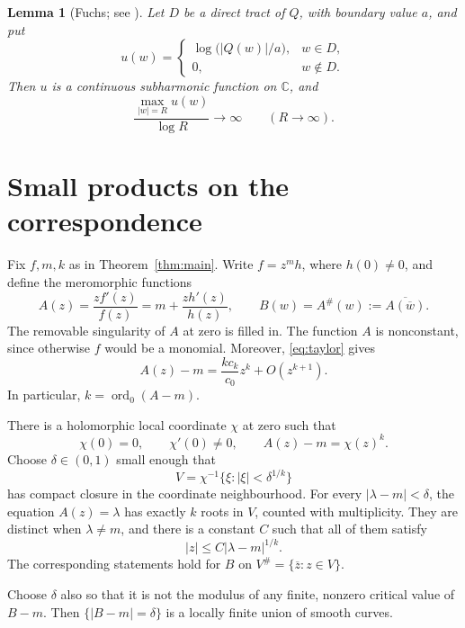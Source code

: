 \documentclass[11pt]{article}
\newtheorem{lemma}[theorem]{Lemma}
\theoremstyle{remark}
\numberwithin{equation}{section}
\DeclareMathOperator{\ord}{ord}
\newcommand{\C}{\mathbb C}
\begin{document}
\begin{lemma}[Fuchs; see {\cite[Theorem 2.1]{BRS}}]
\label{lem:tract}
Let \(D\) be a direct tract of \(Q\), with boundary value \(a\), and put
\[
 u(w)=
 \begin{cases}
  \log\bigl(|Q(w)|/a\bigr),&w\in D,\\
  0,&w\notin D.
 \end{cases}
\]
Then \(u\) is a continuous subharmonic function on \(\C\), and
\begin{equation}\label{eq:tract-growth}
 \frac{\max_{|w|=R}u(w)}{\log R}\longrightarrow\infty
 \qquad(R\to\infty).
\end{equation}
\end{lemma}

\section{Small products on the correspondence}\label{sec:products}

Fix \(f,m,k\) as in Theorem~\ref{thm:main}. Write \(f=z^m h\), where
\(h(0)\ne0\), and define the meromorphic functions
\begin{equation}\label{eq:AB}
 A(z)=\frac{zf'(z)}{f(z)}=m+\frac{zh'(z)}{h(z)},
 \qquad B(w)=A^\#(w):=\overline{A(\overline w)}.
\end{equation}
The removable singularity of \(A\) at zero is filled in.
The function \(A\) is nonconstant, since otherwise \(f\) would be a
monomial. Moreover, \eqref{eq:taylor} gives
\[
 A(z)-m=\frac{kc_k}{c_0}z^k+O(z^{k+1}).
\]
In particular, \(k=\ord_0(A-m)\).

There is a holomorphic local coordinate \(\chi\) at zero such that
\begin{equation}\label{eq:coordinate}
 \chi(0)=0,\qquad\chi'(0)\ne0,
 \qquad A(z)-m=\chi(z)^k.
\end{equation}
Choose \(\delta\in(0,1)\) small enough that
\[
 V=\chi^{-1}\{\xi:|\xi|<\delta^{1/k}\}
\]
has compact closure in the coordinate neighbourhood.
For every \(|\lambda-m|<\delta\), the equation \(A(z)=\lambda\)
has exactly \(k\) roots in \(V\), counted with multiplicity.
They are distinct when \(\lambda\ne m\), and there is a constant
\(C\) such that all of them satisfy
\begin{equation}\label{eq:root-bound}
 |z|\le C|\lambda-m|^{1/k}.
\end{equation}
The corresponding statements hold for \(B\) on
\(V^\#=\{\overline z:z\in V\}\).

Choose \(\delta\) also so that it is not the modulus of any finite,
nonzero critical value of \(B-m\). Then
\(\{|B-m|=\delta\}\) is a locally finite union of smooth curves.
\end{document}

